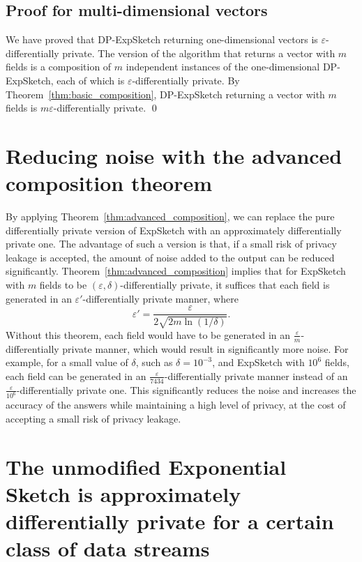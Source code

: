 \subsection{Proof for multi-dimensional vectors}

We have proved that DP-ExpSketch returning one-dimensional vectors is $\varepsilon$-differentially private. The version of the algorithm that returns a vector with $m$ fields is a composition of $m$ independent instances of the one-dimensional DP-ExpSketch, each of which is $\varepsilon$-differentially private. By Theorem~\ref{thm:basic_composition}, DP-ExpSketch returning a vector with $m$ fields is $m\varepsilon$-differentially private. \qed

\section{Reducing noise with the advanced composition theorem}

By applying Theorem~\ref{thm:advanced_composition}, we can replace the pure differentially private version of ExpSketch with an approximately differentially private one. The advantage of such a version is that, if a small risk of privacy leakage is accepted, the amount of noise added to the output can be reduced significantly. Theorem~\ref{thm:advanced_composition} implies that for ExpSketch with $m$ fields to be $(\varepsilon, \delta)$-differentially private, it suffices that each field is generated in an $\varepsilon'$-differentially private manner, where
\[
\varepsilon' = \frac{\varepsilon}{2 \sqrt{2 m \ln(1/\delta)}}.
\]
Without this theorem, each field would have to be generated in an $\frac{\varepsilon}{m}$-differentially private manner, which would result in significantly more noise. For example, for a small value of $\delta$, such as $\delta = 10^{-3}$, and ExpSketch with $10^6$ fields, each field can be generated in an $\frac{\varepsilon}{7434}$-differentially private manner instead of an $\frac{\varepsilon}{10^6}$-differentially private one. This significantly reduces the noise and increases the accuracy of the answers while maintaining a high level of privacy, at the cost of accepting a small risk of privacy leakage.

\section{The unmodified Exponential Sketch is approximately differentially private for a certain class of data streams}

